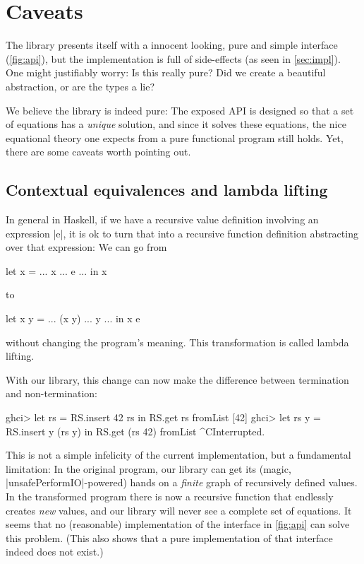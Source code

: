 \documentclass[manuscript,screen,acmsmall,nonacm]{acmart}
\begin{document}
\section{Caveats}\label{sec:limitations}

The library presents itself with a innocent looking, pure and simple interface (\cref{fig:api}), but the implementation is full of side-effects (as seen in \cref{sec:impl}). One might justifiably worry: Is this really pure? Did we create a beautiful abstraction, or are the types a lie?

We believe the library is indeed pure: The exposed API is designed so that a set of equations has a \emph{unique} solution, and since it solves these equations, the nice equational theory one expects from a pure functional program still holds. Yet, there are some caveats worth pointing out.

\subsection{Contextual equivalences and lambda lifting}\label{sec:lim-lambda-lift}

In general in Haskell, if we have a recursive value definition involving an expression |e|, it is ok to turn that into a recursive function definition abstracting over that expression: We can go from
\begin{code}
let x = ... x ... e ... in x
\end{code}
to
\begin{code}
let x y = ... (x y) ... y ... in x e
\end{code}
without changing the program's meaning. This transformation is called lambda lifting.

With our library, this change can now make the difference between termination and non-termination:
\begin{code}
ghci> let rs = RS.insert 42 rs in RS.get rs
fromList [42]
ghci> let rs y = RS.insert y (rs y) in RS.get (rs 42)
fromList ^CInterrupted.
\end{code}
This is not a simple infelicity of the current implementation, but a fundamental limitation: In the original program, our library can get its (magic, |unsafePerformIO|-powered) hands on a \emph{finite} graph of recursively defined values. In the transformed program there is now a recursive function that endlessly creates \emph{new} values, and our library will never see a complete set of equations. It seems that no (reasonable) implementation of the interface in \cref{fig:api} can solve this problem. (This also shows that a pure implementation of that interface indeed does not exist.)
\end{document}
